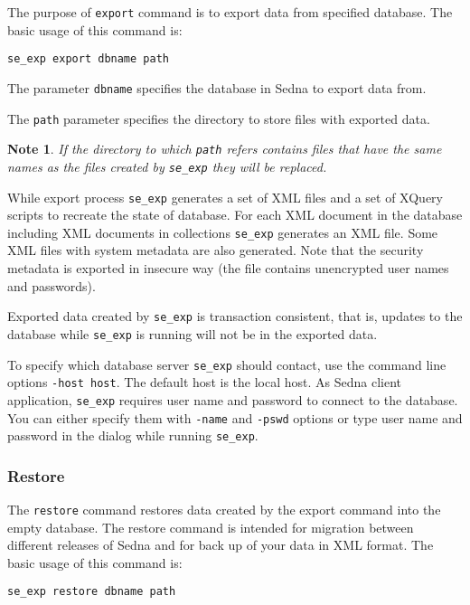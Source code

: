 \documentclass[a4paper,12pt]{article}
\newtheorem{note}{Note}    %
\begin{document}
The purpose of \verb!export! command is to export data from specified database.
The basic usage of this command is:

\begin{verbatim}
se_exp export dbname path
\end{verbatim}

The parameter \verb!dbname! specifies the database in Sedna to export data from.

The \verb!path! parameter specifies the directory to store files with exported
data.

\begin{note}
If the directory to which \verb!path! refers contains files that have the same
names as the files created by \verb!se_exp! they will be replaced.
\end{note}

While export process \verb!se_exp! generates a set of XML files and a set of
XQuery scripts to recreate the state of database. For each XML document in the
database including XML documents in collections \verb!se_exp! generates an XML
file. Some XML files with system metadata are also generated. Note that the
security metadata is exported in insecure way (the file contains unencrypted
user names and passwords).

Exported data created by \verb!se_exp! is transaction consistent, that is,
updates to the database while \verb!se_exp! is running will not be in the
exported data.

To specify which database server \verb!se_exp! should contact, use the command
line options \verb!-host host!. The default host is the local host. As Sedna
client application, \verb!se_exp! requires user name and password to connect to
the database. You can either specify them with \verb!-name! and \verb!-pswd!
options or type user name and password in the dialog while running
\verb!se_exp!.


\subsubsection*{Restore}

The \verb!restore! command restores data created by the export command into the
empty database. The restore command is intended for migration between different
releases of Sedna and for back up of your data in XML format. The basic usage of
this command is:

\begin{verbatim}
se_exp restore dbname path
\end{verbatim}
\end{document}
